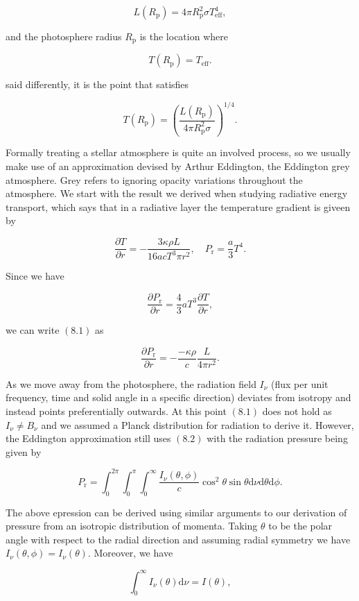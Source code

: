 \documentclass[twocolumn]{article}
\begin{document}
\[L(R_\mathrm{p})=4\pi R_\mathrm{p}^2\sigma T_\mathrm{eff}^4,\]

and the photosphere radius \(R_\mathrm{p}\) is the location where

\[T(R_\mathrm{p})=T_\mathrm{eff}.\]

said differently, it is the point that satisfies

\[T(R_\mathrm{p})=\left(\frac{L(R_\mathrm{p})}{4\pi R_\mathrm{p}^2\sigma}\right)^{1/4}.\]

Formally treating a stellar atmosphere is quite an involved process, so
we usually make use of an approximation devised by Arthur Eddington, the
Eddington grey atmosphere. Grey refers to ignoring opacity variations
throughout the atmosphere. We start with the result we derived when
studying radiative energy transport, which says that in a radiative
layer the temperature gradient is giveen by

\[\frac{\partial T}{\partial r}=-\frac{3\kappa \rho L}{16acT^3\pi r^2},\quad P_\mathrm{r}=\frac{a}{3}T^4.\tag{8.1}\]

Since we have

\[\frac{\partial P_\mathrm{r}}{\partial r}=\frac{4}{3}aT^3\frac{\partial T}{\partial r},\]

we can write \((8.1)\) as

\[\frac{\partial P_\mathrm{r}}{\partial r}=-\frac{-\kappa\rho}{c}\frac{L}{4\pi r^2}.\tag{8.2}\]

As we move away from the photosphere, the radiation field \(I_\nu\)
(flux per unit frequency, time and solid angle in a specific direction)
deviates from isotropy and instead points preferentially outwards. At
this point \((8.1)\) does not hold as \(I_\nu\neq B_\nu\) and we
assumed a Planck distribution for radiation to derive it. However, the
Eddington approximation still uses \((8.2)\) with the radiation
pressure being given by

\[P_\mathrm{r}=\int_0^{2\pi}\int_0^\pi\int_0^\infty\frac{I_\nu(\theta,\phi)}{c}\cos^2\theta\sin\theta\mathrm{d}\nu\mathrm{d}\theta\mathrm{d}\phi.\]

The above epression can be derived using similar arguments to our
derivation of pressure from an isotropic distribution of momenta. Taking
\(\theta\) to be the polar angle with respect to the radial direction
and assuming radial symmetry we have
\(I_\nu(\theta,\phi)=I_\nu(\theta)\). Moreover, we have

\[\int_0^\infty I_\nu(\theta) \mathrm{d}\nu=I(\theta),\]
\end{document}
